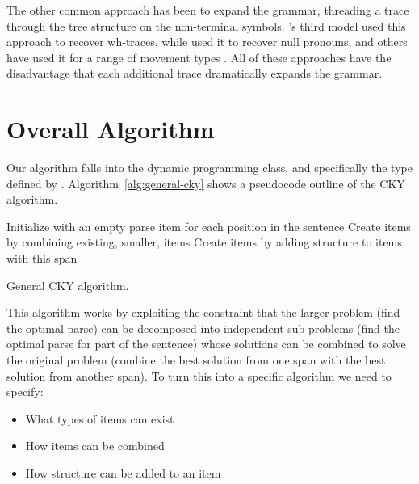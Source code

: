 The other common approach has been to expand the grammar, threading a trace through the tree structure on the non-terminal symbols.
\textcite{Collins:1997}'s third model used this approach to recover wh-traces, while \textcite{cai-chiang-goldberg:2011} used it to recover null pronouns, and others have used it for a range of movement types \parencite{dienes-dubey:2003,schmid:2006}.
All of these approaches have the disadvantage that each additional trace dramatically expands the grammar.

\section{Overall Algorithm} \label{sec:overall-algorithm}

Our algorithm falls into the dynamic programming class, and specifically the type defined by \textcite{Cocke:1969,Kasami:1966,Younger:1967}.
Algorithm~\ref{alg:general-cky} shows a pseudocode outline of the CKY algorithm.

\begin{algorithm}[t]
\centering
\begin{algorithmic}[]
  \State Initialize with an empty parse item for each position in the sentence
      \State Create items by combining existing, smaller, items
      \State Create items by adding structure to items with this span
    \EndFor
  \EndFor
\end{algorithmic}
\caption{\label{alg:general-cky}
General CKY algorithm.
}
\end{algorithm}

This algorithm works by exploiting the constraint that the larger problem (find the optimal parse) can be decomposed into independent sub-problems (find the optimal parse for part of the sentence) whose solutions can be combined to solve the original problem (combine the best solution from one span with the best solution from another span).
To turn this into a specific algorithm we need to specify:

\begin{itemize}
  \item What types of items can exist
  \item How items can be combined
  \item How structure can be added to an item
\end{itemize}

